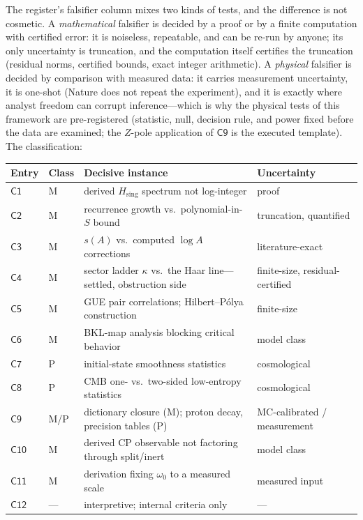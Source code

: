 \documentclass[11pt,a4paper]{article}
\theoremstyle{plain}
\theoremstyle{definition}
\theoremstyle{remark}
\begin{document}
The register's falsifier column mixes two kinds of tests, and the difference is not
cosmetic. A \emph{mathematical} falsifier is decided by a proof or by a finite computation
with certified error: it is noiseless, repeatable, and can be re-run by anyone; its only
uncertainty is truncation, and the computation itself certifies the truncation (residual
norms, certified bounds, exact integer arithmetic). A \emph{physical} falsifier is decided
by comparison with measured data: it carries measurement uncertainty, it is one-shot
(Nature does not repeat the experiment), and it is exactly where analyst freedom can
corrupt inference---which is why the physical tests of this framework are
pre-registered (statistic, null, decision rule, and power fixed before the data are
examined; the $Z$-pole application of $\mathsf{C9}$ is the executed template). The
classification:

\begin{center}
\small
\begin{tabular}{@{}llp{}l@{}}
\toprule
\textbf{Entry} & \textbf{Class} & \textbf{Decisive instance} & \textbf{Uncertainty}\\
\midrule
$\mathsf{C1}$ & M & derived $H_{\mathrm{sing}}$ spectrum not log-integer & proof\\
$\mathsf{C2}$ & M & recurrence growth vs.\ polynomial-in-$S$ bound & truncation, quantified\\
$\mathsf{C3}$ & M & $s(A)$ vs.\ computed $\log A$ corrections & literature-exact\\
$\mathsf{C4}$ & M & sector ladder $\kappa$ vs.\ the Haar line---settled, obstruction side & finite-size, residual-certified\\
$\mathsf{C5}$ & M & GUE pair correlations; Hilbert--P\'olya construction & finite-size\\
$\mathsf{C6}$ & M & BKL-map analysis blocking critical behavior & model class\\
$\mathsf{C7}$ & P & initial-state smoothness statistics & cosmological\\
$\mathsf{C8}$ & P & CMB one- vs.\ two-sided low-entropy statistics & cosmological\\
$\mathsf{C9}$ & M/P & dictionary closure (M); proton decay, precision tables (P) & MC-calibrated / measurement\\
$\mathsf{C10}$ & M & derived CP observable not factoring through split/inert & model class\\
$\mathsf{C11}$ & M & derivation fixing $\omega_{0}$ to a measured scale & measured input\\
$\mathsf{C12}$ & --- & interpretive; internal criteria only & ---\\
\bottomrule
\end{tabular}
\end{center}
\end{document}
